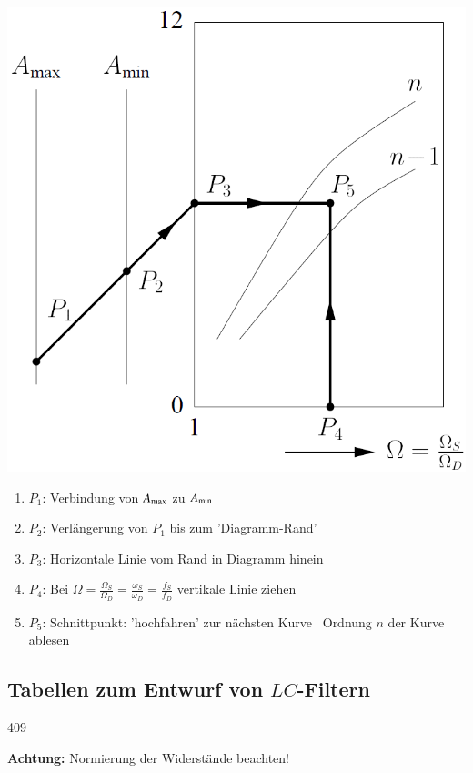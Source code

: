 \begin{minipage}[c]{0.42\columnwidth}
    \includegraphics[width=\columnwidth]{images/filter_nomogramme.png}
\end{minipage}
\hfill
\begin{minipage}[c]{0.56\columnwidth}
    \begin{center}
        \textbf{}
    \end{center}
    
    \begin{enumerate}
        \item $P_1$: Verbindung von $A_{\rm max}$ zu $A_{\rm min}$
        \item $P_2$: Verlängerung von $P_1$ bis zum 'Diagramm-Rand'
        \item $P_3$: Horizontale Linie vom Rand in Diagramm hinein
        \item $P_4$: Bei $\Omega = \frac{\Omega_S}{\Omega_D} = \frac{\omega_S}{\omega_D} = \frac{f_S}{f_D}$ vertikale Linie ziehen
        \item $P_5$: Schnittpunkt: 'hochfahren' zur nächsten Kurve \textrightarrow\ Ordnung $n$ der Kurve ablesen
    \end{enumerate}
\end{minipage}


\subsection[Tabellen zum Entwurf von LC-Filtern]{Tabellen zum Entwurf von $LC$-Filtern}{409}
\label{Tabellen}

\textbf{Achtung:} Normierung der Widerstände beachten!